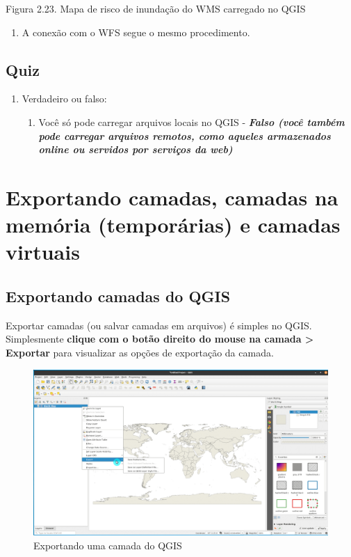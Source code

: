 \documentclass[
]{krantz}
\providecommand{\tightlist}{%
  \setlength{\itemsep}{0pt}\setlength{\parskip}{0pt}}
\begin{document}
Figura 2.23. Mapa de risco de inundação do WMS carregado no QGIS

\begin{enumerate}
\def\labelenumi{\arabic{enumi}.}
\setcounter{enumi}{6}
\tightlist
\item
  A conexão com o WFS segue o mesmo procedimento.
\end{enumerate}

\hypertarget{quiz-7}{%
\subsection{Quiz}\label{quiz-7}}

\begin{enumerate}
\def\labelenumi{\arabic{enumi}.}
\item
  Verdadeiro ou falso:

  \begin{enumerate}
  \def\labelenumii{\arabic{enumii}.}
  \tightlist
  \item
    Você só pode carregar arquivos locais no QGIS - \textbf{\emph{Falso (você também pode carregar arquivos remotos, como aqueles armazenados online ou servidos por serviços da web)}}
  \end{enumerate}
\end{enumerate}

\hypertarget{exportando-camadas-camadas-na-memuxf3ria-temporuxe1rias-e-camadas-virtuais}{%
\section{Exportando camadas, camadas na memória (temporárias) e camadas virtuais}\label{exportando-camadas-camadas-na-memuxf3ria-temporuxe1rias-e-camadas-virtuais}}

\hypertarget{exportando-camadas-do-qgis}{%
\subsection{Exportando camadas do QGIS}\label{exportando-camadas-do-qgis}}

Exportar camadas (ou salvar camadas em arquivos) é simples no QGIS. Simplesmente \textbf{clique com o botão direito do mouse na camada \textgreater{} Exportar} para visualizar as opções de exportação da camada.

\begin{figure}
\centering
\includegraphics{media/modulo2/exporting-layers.png}
\caption{Exportando uma camada do QGIS}
\end{figure}
\end{document}
